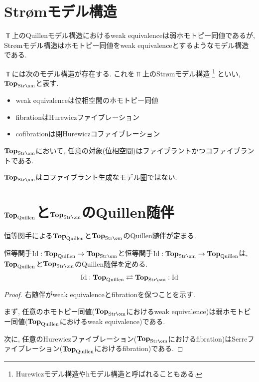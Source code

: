 \documentclass[uplatex, a4paper, 14Q, dvipdfmx]{jsarticle}
\begin{document}
\section{Str{\o}mモデル構造}

$\Top$上のQuillenモデル構造におけるweak equivalenceは弱ホモトピー同値であるが, Str{\o}mモデル構造はホモトピー同値をweak equivalenceとするようなモデル構造である. 

\begin{definition}
  $\Top$には次のモデル構造が存在する. 
  これを$\Top$上のStr{\o}mモデル構造
  \footnote{
    Hurewiczモデル構造やhモデル構造と呼ばれることもある.
  }
  といい, $\TopStrom$と表す. 
  \begin{itemize}
    \item weak equivalenceは位相空間のホモトピー同値
    \item fibrationはHurewiczファイブレーション
    \item cofibrationは閉Hurewiczコファイブレーション
  \end{itemize}
\end{definition}

\begin{remark}
  $\TopStrom$において, 任意の対象(位相空間)はファイブラントかつコファイブラントである.
\end{remark}

\begin{remark}
  $\TopStrom$はコファイブラント生成なモデル圏ではない. 
\end{remark}

\section{$\mathbf{Top}_\mathrm{Quillen}$と$\TopStrom$のQuillen随伴}

恒等関手による$\mathbf{Top}_\mathrm{Quillen}$と$\TopStrom$のQuillen随伴が定まる. 

\begin{proposition} \label{prop:quillen_adj_TopQuillen_TopStrom}
  恒等関手$\Id : \TopQuillen \to \TopStrom$と恒等関手$\Id : \TopStrom \to \TopQuillen$は, $\mathbf{Top}_\mathrm{Quillen}$と$\TopStrom$のQuillen随伴を定める. 
  \begin{align*}
    \Id : \TopQuillen \rightleftarrows \TopStrom : \Id
  \end{align*}
\end{proposition}

\begin{proof}
  右随伴がweak equivalenceとfibrationを保つことを示す. 

  まず, 任意のホモトピー同値($\TopStrom$におけるweak equivalence)は弱ホモトピー同値($\mathbf{Top}_\mathrm{Quillen}$におけるweak equivalence)である. 

  次に, 任意のHurewiczファイブレーション($\TopStrom$におけるfibration)はSerreファイブレーション($\mathbf{Top}_\mathrm{Quillen}$におけるfibration)である.
\end{proof}
\end{document}
